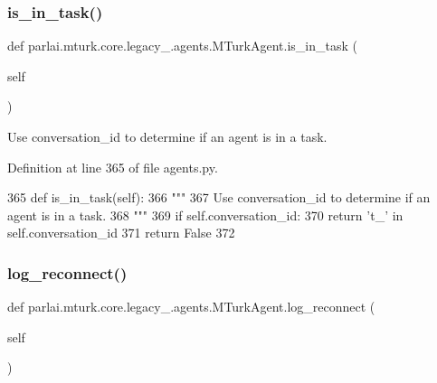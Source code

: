 \subsubsection{\texorpdfstring{is\+\_\+in\+\_\+task()}{is\_in\_task()}}
{\footnotesize\ttfamily def parlai.\+mturk.\+core.\+legacy\+\_.\+agents.\+M\+Turk\+Agent.\+is\+\_\+in\+\_\+task (\begin{DoxyParamCaption}\item[{}]{self }\end{DoxyParamCaption})}

\begin{DoxyVerb}Use conversation_id to determine if an agent is in a task.
\end{DoxyVerb}
 

Definition at line 365 of file agents.\+py.


\begin{DoxyCode}
365     \textcolor{keyword}{def }is\_in\_task(self):
366         \textcolor{stringliteral}{"""}
367 \textcolor{stringliteral}{        Use conversation\_id to determine if an agent is in a task.}
368 \textcolor{stringliteral}{        """}
369         \textcolor{keywordflow}{if} self.conversation\_id:
370             \textcolor{keywordflow}{return} \textcolor{stringliteral}{'t\_'} \textcolor{keywordflow}{in} self.conversation\_id
371         \textcolor{keywordflow}{return} \textcolor{keyword}{False}
372 
\end{DoxyCode}
\mbox{\label{classparlai_1_1mturk_1_1core_1_1legacy__2018_1_1agents_1_1MTurkAgent_affe73b112be62cb32e0f8122c5f030fd}} 
\subsubsection{\texorpdfstring{log\+\_\+reconnect()}{log\_reconnect()}}
{\footnotesize\ttfamily def parlai.\+mturk.\+core.\+legacy\+\_.\+agents.\+M\+Turk\+Agent.\+log\+\_\+reconnect (\begin{DoxyParamCaption}\item[{}]{self }\end{DoxyParamCaption})}

